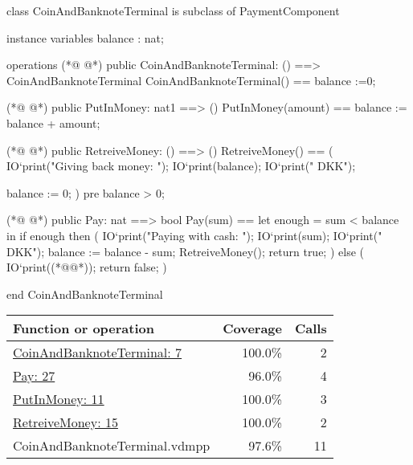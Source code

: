 \begin{vdmpp}
class CoinAndBanknoteTerminal is subclass of PaymentComponent

instance variables
 balance : nat;

operations
(*@
\label{CoinAndBanknoteTerminal:7}
@*)
 public CoinAndBanknoteTerminal: () ==> CoinAndBanknoteTerminal
  CoinAndBanknoteTerminal() ==
   balance :=0;

(*@
\label{PutInMoney:11}
@*)
 public PutInMoney: nat1 ==> ()
  PutInMoney(amount) ==
   balance := balance + amount;

(*@
\label{RetreiveMoney:15}
@*)
 public RetreiveMoney: () ==> ()
  RetreiveMoney() ==
  (
   IO`print("Giving back money: ");
   IO`print(balance);
   IO`print(" DKK\n");
   
   balance := 0;
  )
  pre balance > 0;
  
  
(*@
\label{Pay:27}
@*)
 public Pay: nat ==> bool
  Pay(sum) ==
   let enough = sum < balance
      in
    if enough then
    (
     IO`print("Paying with cash: ");
     IO`print(sum);
     IO`print(" DKK\n");
     balance := balance - sum;
     RetreiveMoney();
     return true;
    ) else 
    (  
     IO`print((*@@*));
     return false;
    )
     

end CoinAndBanknoteTerminal
\end{vdmpp}
\bigskip
\begin{longtable}{|l|r|r|}
\hline
Function or operation & Coverage & Calls \\
\hline
\hline
\hyperref[CoinAndBanknoteTerminal:7]{CoinAndBanknoteTerminal: 7} & 100.0\% & 2 \\
\hline
\hyperref[Pay:27]{Pay: 27} & 96.0\% & 4 \\
\hline
\hyperref[PutInMoney:11]{PutInMoney: 11} & 100.0\% & 3 \\
\hline
\hyperref[RetreiveMoney:15]{RetreiveMoney: 15} & 100.0\% & 2 \\
\hline
\hline
CoinAndBanknoteTerminal.vdmpp & 97.6\% & 11 \\
\hline
\end{longtable}

